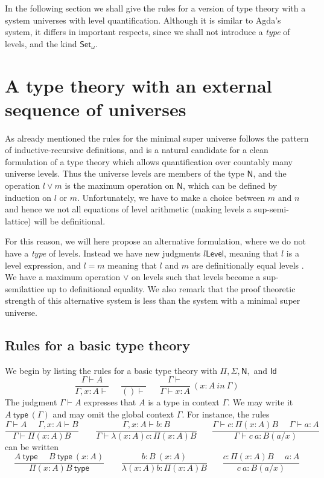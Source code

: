 \documentclass[11pt,a4paper]{article}
\newcommand{\Id}{\mathsf{Id}}
\def\Level{\mathsf{Level}}
\newcommand{\type}{\mathsf{type}}
\newcommand{\N}{\mathsf{N}}
\newcommand{\Set}{\mathsf{Set}}
\begin{document}
In the following section we shall give the rules for a version of type theory with a system universes with level quantification. Although it is similar to Agda's system, it differs in important respects, since we shall not introduce a {\em type} of levels, and the kind $\Set_\omega$.

\section{A type theory with an external sequence of universes}\label{external}

As already mentioned the rules for the minimal super universe follows the pattern of inductive-recursive definitions, and is a natural candidate for a clean formulation of a type theory which allows quantification over countably many universe levels. Thus the universe levels are members of the type $\N$, and the operation $l \vee m$ is the maximum operation on $\N$, which can be defined by induction on $l$ or $m$. Unfortunately, we have to make a choice between $m$ and $n$ and hence we not all equations of level arithmetic (making levels a sup-semi-lattice) will be definitional.

For this reason, we will here propose an alternative formulation, where we do not have a {\em type} of levels. Instead we have new judgments $l \Level$, meaning that $l$ is a level expression, and $l = m$ meaning that $l$ and $m$ are definitionally equal levels . We have a maximum operation $\vee$ on levels such that levels become a sup-semilattice up to definitional equality. We also remark that the proof theoretic strength of this alternative system is less than the system with a minimal super universe.

\subsection*{Rules for a basic type theory}

We begin by listing the rules for a basic type theory with $\Pi, \Sigma, \N,$ and $\Id$
$$
\frac{\Gamma\vdash A}{\Gamma,x:A\vdash}~~~~~~\frac{}{()\vdash}~~~~~~~
\frac{\Gamma\vdash}{\Gamma\vdash x:A}~(x\!:\! A~in~\Gamma)
$$
The judgment $\Gamma\vdash A$ expresses that $A$ is a type in context $\Gamma$.
We may write it $A~\type~(\Gamma)$ and may omit the global context $\Gamma$.
For instance, the rules
$$
\frac{\Gamma\vdash A~~~~~~\Gamma,x:A\vdash B}{\Gamma\vdash \Pi (x:A) B}~~~~~~~~~
\frac{\Gamma,x:A\vdash b:B}{\Gamma\vdash \lambda (x:A) c:\Pi (x:A) B}~~~~~~~~
\frac{\Gamma\vdash c:\Pi (x:A) B~~~~~~\Gamma\vdash a:A}
     {\Gamma\vdash c~a:B(a/x)}
$$
can be written
$$
\frac{A~\type~~~~~~B~\type~(x:A)}{\Pi (x:A) B~\type}~~~~~~~~~
\frac{b:B~(x:A)}{\lambda (x:A) b:\Pi (x:A) B}~~~~~~~~
\frac{c:\Pi (x:A) B~~~~~~a:A}
     {c~a:B(a/x)}
$$
\end{document}
